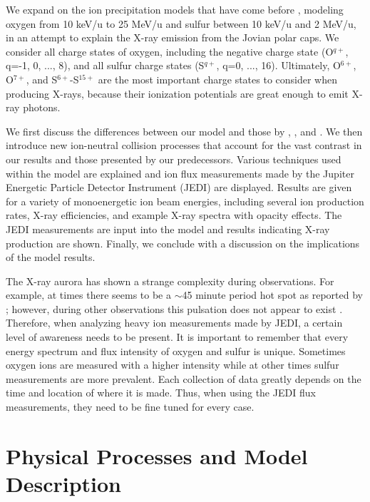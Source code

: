 \documentclass[draft]{agujournal2018}
\begin{document}
We expand on the ion precipitation models that have come before \citep{cravens1995,ozak2010,ozak2013,houston2018}, modeling oxygen from 10 keV/u to 25 MeV/u and sulfur between 10 keV/u and 2 MeV/u, in an attempt to explain the X-ray emission from the Jovian polar caps.
We consider all charge states of oxygen, including the negative charge state (O$^{q+}$, q=-1, 0, ..., 8), and all sulfur charge states (S$^{q+}$, q=0, ..., 16).
Ultimately, O$^{6+}$, O$^{7+}$, and S$^{6+}$-S$^{15+}$ are the most important charge states to consider when producing X-rays, because their ionization potentials are great enough to emit X-ray photons.

We first discuss the differences between our model and those by \citet{ozak2010}, \citet{ozak2013}, and \citet{houston2018}.
We then introduce new ion-neutral collision processes that account for the vast contrast in our results and those presented by our predecessors.
Various techniques used within the model are explained and ion flux measurements made by the Jupiter Energetic Particle Detector Instrument (JEDI) \citep{mauk2017ssr} are displayed.
Results are given for a variety of monoenergetic ion beam energies, including several ion production rates, X-ray efficiencies, and example X-ray spectra with opacity effects.
The JEDI measurements are input into the model and results indicating X-ray production are shown.
Finally, we conclude with a discussion on the implications of the model results.

The X-ray aurora has shown a strange complexity during observations.
For example, at times there seems to be a $\sim$45 minute period hot spot as reported by \citet{gladstone2002}; however, during other observations this pulsation does not appear to exist \citep{elsner2005,branduardi2007}.
Therefore, when analyzing heavy ion measurements made by JEDI, a certain level of awareness needs to be present.
It is important to remember that every energy spectrum and flux intensity of oxygen and sulfur is unique.
Sometimes oxygen ions are measured with a higher intensity while at other times sulfur measurements are more prevalent.
Each collection of data greatly depends on the time and location of where it is made.
Thus, when using the JEDI flux measurements, they need to be fine tuned for every case.

\section{Physical Processes and Model Description}
\end{document}
